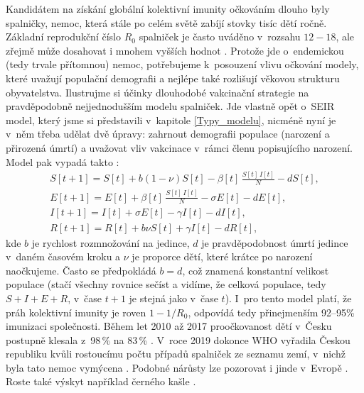 Kandidátem na získání globální kolektivní imunity očkováním dlouho byly spal\-nič\-ky, nemoc, která stále po celém světě zabíjí stovky tisíc dětí ročně. Základní reprodukční číslo $R_0$ spalniček je často uváděno v~rozsahu $12-18$, ale zřejmě může dosahovat i mnohem vyšších hodnot \cite{Guerra_etal2017}. Protože jde o~endemickou (tedy trvale přítomnou) nemoc, potřebujeme k~posouzení vlivu očkování modely, které uvažují populační demografii a nejlépe také rozlišují věkovou strukturu obyvatelstva. Ilustrujme si účinky dlouhodobé vakcinační strategie na pravděpodobně nejjednodušším modelu spalniček. Jde vlastně opět o~SEIR model, který jsme si představili v~kapitole \ref{Typy_modelu}, nicméně nyní je v~něm třeba udělat dvě úpravy: zahrnout demografii populace (narození a přirozená úmrtí) a uvažovat vliv vakcinace v~rámci členu popisujícího narození. Model pak vypadá takto \cite{BolkerGrenfell1993}:
\begin{equation}
	\begin{array}{l}
		\displaystyle{S[t+1] = S[t] + b (1-\nu) S[t] - \beta[t] \, \frac{S[t]\,I[t]}{N} - d S[t]}, \\[3ex]
		\displaystyle{E[t+1] = E[t] + \beta[t] \, \frac{S[t]\,I[t]}{N} - \sigma E[t] - d E[t]}, \\[3ex]
		\displaystyle{I[t+1] = I[t] + \sigma E[t] - \gamma I[t] - d I[t]}, \\[3ex]
		\displaystyle{R[t+1] = R[t] + b \nu S[t] + \gamma I[t] - d R[t]},
	\end{array}
	\label{measles-model1}
\end{equation}
kde $b$ je rychlost rozmnožování na jedince, $d$ je pravděpodobnost úmrtí jedince v~daném časovém kroku a $\nu$ je proporce dětí, které krátce po narození naočkujeme. Často se předpokládá $b=d$, což znamená konstantní velikost populace (stačí všechny rovnice sečíst a vidíme, že celková populace, tedy $S+I+E+R$, v~čase $t+1$ je stejná jako v~čase $t$). I~pro tento model platí, že práh kolektivní imunity je roven $1-1/R_0$, odpovídá tedy přinejmenším 92--95\% imunizaci společnosti. Během let 2010 až 2017 proočkovanost dětí v~Česku postupně klesala z~98\,\% na 83\,\% \cite{spavac}. V~roce 2019 dokonce WHO vyřadila Českou republiku kvůli rostoucímu počtu případů spalniček ze seznamu zemí, v~nichž byla tato nemoc vymýcena \cite{spaend}. Podobné nárůsty lze pozorovat i jinde v~Evropě \cite{Thornton2019}. Roste také výskyt například černého kašle \cite{Lavine_etal2011}. 

